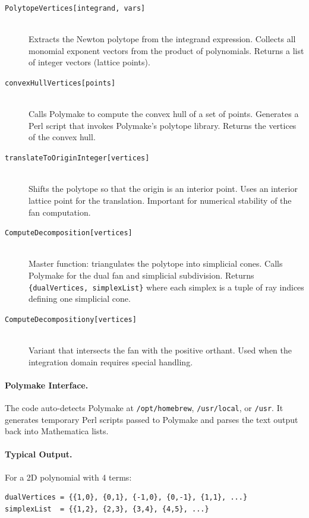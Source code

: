 \documentclass[11pt,a4paper]{article}
\begin{document}
\begin{description}
  \item[\texttt{PolytopeVertices[integrand, vars]}] ~\\
    Extracts the Newton polytope from the integrand expression. Collects all monomial exponent vectors from the product of polynomials. Returns a list of integer vectors (lattice points).

  \item[\texttt{convexHullVertices[points]}] ~\\
    Calls Polymake to compute the convex hull of a set of points. Generates a Perl script that invokes Polymake's polytope library. Returns the vertices of the convex hull.

  \item[\texttt{translateToOriginInteger[vertices]}] ~\\
    Shifts the polytope so that the origin is an interior point. Uses an interior lattice point for the translation. Important for numerical stability of the fan computation.

  \item[\texttt{ComputeDecomposition[vertices]}] ~\\
    Master function: triangulates the polytope into simplicial cones. Calls Polymake for the dual fan and simplicial subdivision. Returns \texttt{\{dualVertices, simplexList\}} where each simplex is a tuple of ray indices defining one simplicial cone.

  \item[\texttt{ComputeDecompositiony[vertices]}] ~\\
    Variant that intersects the fan with the positive orthant. Used when the integration domain requires special handling.
\end{description}

\paragraph{Polymake Interface.}
The code auto-detects Polymake at \texttt{/opt/homebrew}, \texttt{/usr/local}, or \texttt{/usr}. It generates temporary Perl scripts passed to Polymake and parses the text output back into Mathematica lists.

\paragraph{Typical Output.}
For a 2D polynomial with 4 terms:
\begin{lstlisting}
dualVertices = {{1,0}, {0,1}, {-1,0}, {0,-1}, {1,1}, ...}
simplexList  = {{1,2}, {2,3}, {3,4}, {4,5}, ...}
\end{lstlisting}
\end{document}
